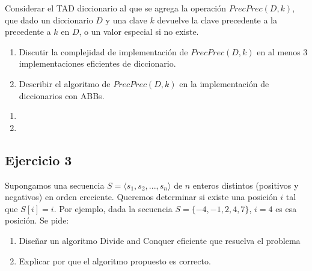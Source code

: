 \documentclass[10pt, a4paper]{article}
\begin{document}
Considerar el TAD diccionario al que se agrega la operaci\'on $PrecPrec(D,k)$, que dado un diccionario $D$ y una clave $k$ devuelve la clave precedente a la precedente a $k$ en $D$, o un valor especial si no existe.
\begin{enumerate}
 \item Discutir la complejidad de implementaci\'on de $PrecPrec(D,k)$ en al menos $3$ implementaciones eficientes de diccionario.
 \item Describir el algoritmo de $PrecPrec(D,k)$ en la implementaci\'on de diccionarios con ABBs.
\end{enumerate}

\begin{enumerate}
 \item 
 \item
\end{enumerate}


\subsection*{Ejercicio 3}

Supongamos una secuencia $S = \langle s_1, s_2, ..., s_n \rangle$ de $n$ enteros distintos (positivos y negativos) en orden creciente. Queremos determinar si existe una posici\'on $i$ tal que $S[i]=i$. Por ejemplo, dada la secuencia $S = \{-4,-1,2,4,7\}$, $i=4$ es esa posici\'on. Se pide:
\begin{enumerate}
 \item Dise\~nar un algoritmo Divide and Conquer eficiente que resuelva el problema
 \item Explicar por que el algoritmo propuesto es correcto.
\end{enumerate}
\end{document}
